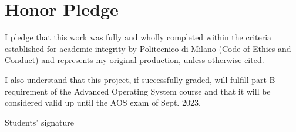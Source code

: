 \section{Honor Pledge}

I pledge that this work was fully and wholly completed within the criteria established for academic integrity by Politecnico di Milano (Code of Ethics and Conduct) and represents my original production, unless otherwise cited.

I also understand that this project, if successfully graded, will fulfill part B requirement of the Advanced Operating System course and that it will be considered valid up until the AOS exam of Sept. 2023.

\begin{flushright}
    Students' signature
\end{flushright}
